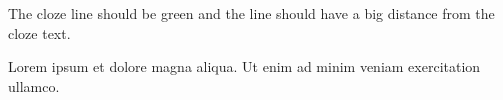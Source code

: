 \documentclass{article}
\begin{document}
{The cloze line should be green and the line should have a big
distance from the cloze text.}

Lorem ipsum  et dolore magna aliqua. Ut enim ad
minim veniam exercitation ullamco.
\end{document}
